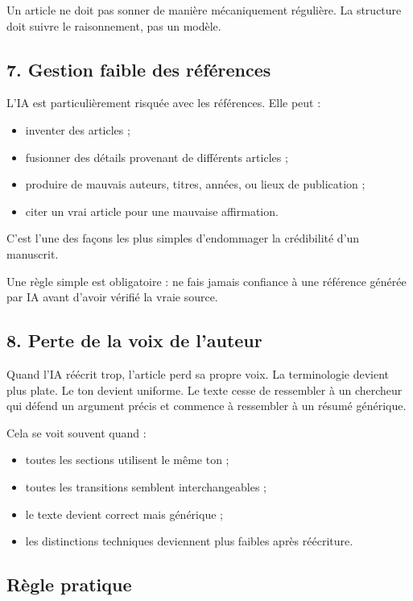 \documentclass[11pt,a4paper]{article}
\theoremstyle{definition}
\begin{document}
Un article ne doit pas sonner de manière mécaniquement régulière. La structure doit suivre le raisonnement, pas un modèle.

\subsection*{7. Gestion faible des références}

L'IA est particulièrement risquée avec les références.
Elle peut :
\begin{itemize}
    \item inventer des articles ;
    \item fusionner des détails provenant de différents articles ;
    \item produire de mauvais auteurs, titres, années, ou lieux de publication ;
    \item citer un vrai article pour une mauvaise affirmation.
\end{itemize}

C'est l'une des façons les plus simples d'endommager la crédibilité d'un manuscrit.

Une règle simple est obligatoire :
ne fais jamais confiance à une référence générée par IA avant d'avoir vérifié la vraie source.

\subsection*{8. Perte de la voix de l'auteur}

Quand l'IA réécrit trop, l'article perd sa propre voix.
La terminologie devient plus plate.
Le ton devient uniforme.
Le texte cesse de ressembler à un chercheur qui défend un argument précis et commence à ressembler à un résumé générique.

Cela se voit souvent quand :
\begin{itemize}
    \item toutes les sections utilisent le même ton ;
    \item toutes les transitions semblent interchangeables ;
    \item le texte devient correct mais générique ;
    \item les distinctions techniques deviennent plus faibles après réécriture.
\end{itemize}

\subsection*{Règle pratique}
\end{document}
